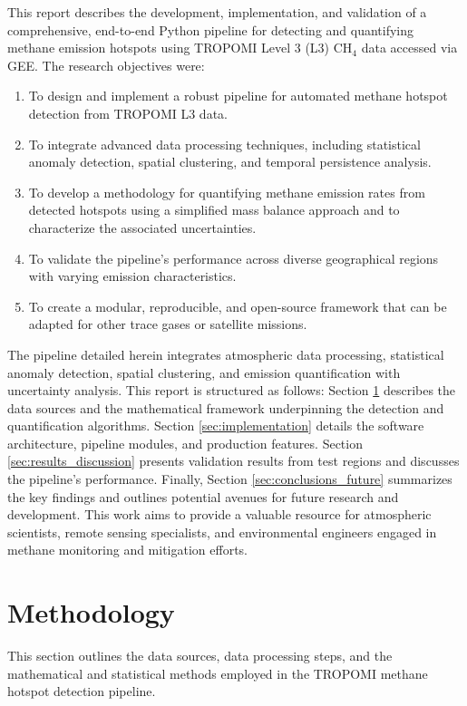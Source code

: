 \documentclass[12pt,a4paper]{article}
\begin{document}
This report describes the development, implementation, and validation of a comprehensive, end-to-end Python pipeline for detecting and quantifying methane emission hotspots using TROPOMI Level 3 (L3) CH$_4$ data accessed via GEE. The research objectives were:
\begin{enumerate}
    \item To design and implement a robust pipeline for automated methane hotspot detection from TROPOMI L3 data.
    \item To integrate advanced data processing techniques, including statistical anomaly detection, spatial clustering, and temporal persistence analysis.
    \item To develop a methodology for quantifying methane emission rates from detected hotspots using a simplified mass balance approach and to characterize the associated uncertainties.
    \item To validate the pipeline's performance across diverse geographical regions with varying emission characteristics.
    \item To create a modular, reproducible, and open-source framework that can be adapted for other trace gases or satellite missions.
\end{enumerate}

The pipeline detailed herein integrates atmospheric data processing, statistical anomaly detection, spatial clustering, and emission quantification with uncertainty analysis. This report is structured as follows: Section \ref{sec:methodology} describes the data sources and the mathematical framework underpinning the detection and quantification algorithms. Section \ref{sec:implementation} details the software architecture, pipeline modules, and production features. Section \ref{sec:results_discussion} presents validation results from test regions and discusses the pipeline's performance. Finally, Section \ref{sec:conclusions_future} summarizes the key findings and outlines potential avenues for future research and development. This work aims to provide a valuable resource for atmospheric scientists, remote sensing specialists, and environmental engineers engaged in methane monitoring and mitigation efforts.

\section{Methodology}
\label{sec:methodology}
This section outlines the data sources, data processing steps, and the mathematical and statistical methods employed in the TROPOMI methane hotspot detection pipeline.
\end{document}
